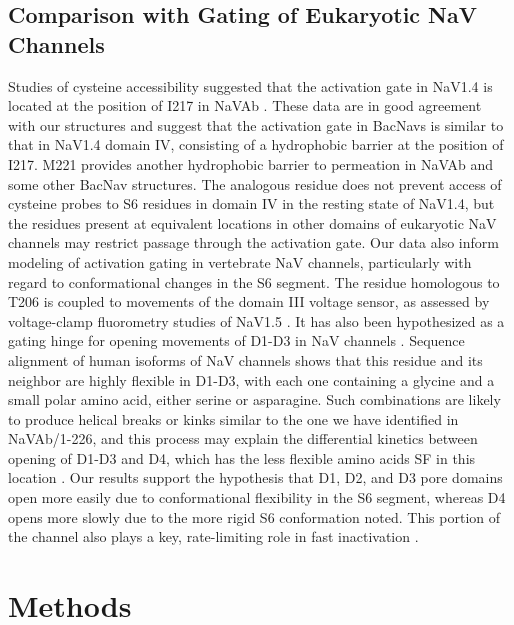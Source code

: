 \begin{refsection}
{\subsection{Comparison with Gating of Eukaryotic NaV Channels} 
Studies of cysteine accessibility suggested that the activation gate in NaV1.4 is located at the position of I217 in NaVAb \cite{Oelstrom:2016dl,Oelstrom:2014ky}. These data are in good agreement with our structures and suggest that the activation gate in BacNavs is similar to that in NaV1.4 domain IV, consisting of a hydrophobic barrier at the position of I217. M221 provides another hydrophobic barrier to permeation in NaVAb and some other BacNav structures. The analogous residue does not prevent access of cysteine probes to S6 residues in domain IV in the resting state of NaV1.4, but the residues present at equivalent locations in other domains of eukaryotic NaV channels may restrict passage through the activation gate.
Our data also inform modeling of activation gating in vertebrate NaV channels, particularly with regard to conformational changes in the S6 segment. The residue homologous to T206 is coupled to movements of the domain III voltage sensor, as assessed by voltage-clamp fluorometry studies of NaV1.5 \cite{ArcisioMiranda:2010gz,Muroi:2010do}. It has also been hypothesized as a gating hinge for opening movements of D1-D3 in NaV channels \cite{Zhao:2004vo}. Sequence alignment of human isoforms of NaV channels shows that this residue and its neighbor are highly flexible in D1-D3, with each one containing a glycine and a small polar amino acid, either serine or asparagine. Such combinations are likely to produce helical breaks or kinks similar to the one we have identified in NaVAb/1-226, and this process may explain the differential kinetics between opening of D1-D3 and D4, which has the less flexible amino acids SF in this location \cite{Chanda:2002gk}. Our results support the hypothesis that D1, D2, and D3 pore domains open more easily due to conformational flexibility in the S6 segment, whereas D4 opens more slowly due to the more rigid S6 conformation noted. This portion of the channel also plays a key, rate-limiting role in fast inactivation \cite{Capes:2013cc}.

\section{Methods} 

}
\end{refsection}
